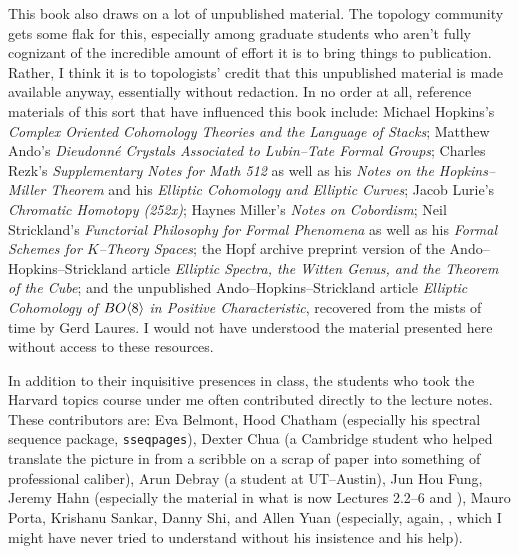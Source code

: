 This book also draws on a lot of unpublished material.  The topology community gets some flak for this, especially among graduate students who aren't fully cognizant of the incredible amount of effort it is to bring things to publication.  Rather, I think it is to topologists' credit that this unpublished material is made available anyway, essentially without redaction.  In no order at all, reference materials of this sort that have influenced this book include: Michael Hopkins's \textit{Complex Oriented Cohomology Theories and the Language of Stacks}; Matthew Ando's \textit{Dieudonn\'e Crystals Associated to Lubin--Tate Formal Groups}; Charles Rezk's \textit{Supplementary Notes for Math 512} as well as his \textit{Notes on the Hopkins--Miller Theorem} and his \textit{Elliptic Cohomology and Elliptic Curves}; Jacob Lurie's \textit{Chromatic Homotopy (252x)}; Haynes Miller's \textit{Notes on Cobordism}; Neil Strickland's \textit{Functorial Philosophy for Formal Phenomena} as well as his \textit{Formal Schemes for $K$--Theory Spaces}; the Hopf archive preprint version of the Ando--Hopkins--Strickland article \textit{Elliptic Spectra, the Witten Genus, and the Theorem of the Cube}; and the unpublished Ando--Hopkins--Strickland article \textit{Elliptic Cohomology of $BO\langle8\rangle$ in Positive Characteristic}, recovered from the mists of time by Gerd Laures.  I would not have understood the material presented here without access to these resources.

In addition to their inquisitive presences in class, the students who took the Harvard topics course under me often contributed directly to the lecture notes.  These contributors are: Eva Belmont, Hood Chatham (especially his spectral sequence package, \texttt{sseqpages}), Dexter Chua (a Cambridge student who helped translate the picture in  from a scribble on a scrap of paper into something of professional caliber), Arun Debray (a student at UT--Austin), Jun Hou Fung, Jeremy Hahn (especially the material in what is now Lectures 2.2--6 and ), Mauro Porta, Krishanu Sankar, Danny Shi, and Allen Yuan (especially, again, , which I might have never tried to understand without his insistence and his help).

